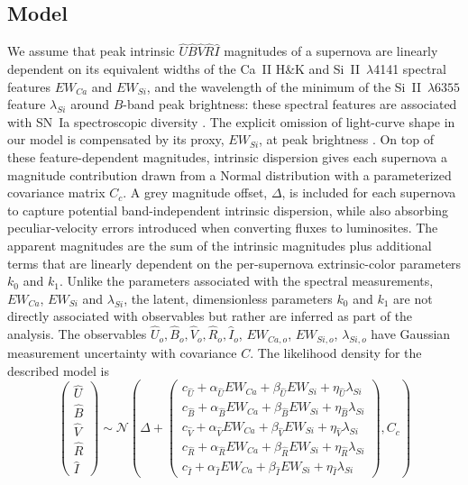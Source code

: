 \documentclass{aastex61}   	%
\begin{document}
\subsection{Model}
\label{modelmodel:sec}
We assume 
that  peak intrinsic ${\hat{U}}{\hat{B}}\hat{V}\hat{R}\hat{I}$ magnitudes of a supernova are linearly dependent
on its
 equivalent widths of the Ca~II H\&K and Si~II~$\lambda$4141 spectral features
$EW_{Ca}$ and $EW_{Si}$,
and the wavelength of the minimum of 
the Si~II~$\lambda6355$ feature $\lambda_{Si}$
around $B$-band peak brightness:
these spectral features are associated with SN~Ia  spectroscopic diversity  
\citep{2006PASP..118..560B, 2008A&A...492..535A, 2009A&A...500L..17B, 2009PASP..121..238B, 2009ApJ...699L.139W, 2011ApJ...729...55F}.
The explicit omission of light-curve shape in our model is compensated by its proxy,
$EW_{Si}$, at peak brightness
\citep{2008A&A...492..535A, 2011A&A...529L...4C}. On top of these feature-dependent magnitudes, intrinsic dispersion
gives each supernova a magnitude contribution drawn from a Normal distribution with a parameterized covariance matrix
$C_c$.  A grey magnitude offset, $\Delta$, is included for each supernova
to capture 
potential
band-independent intrinsic dispersion, while also absorbing peculiar-velocity errors introduced when converting
fluxes to luminosites.
The apparent magnitudes are the sum of the intrinsic magnitudes plus additional terms that are linearly dependent on the
per-supernova
extrinsic-color parameters $k_0$ and $k_1$.  
Unlike the parameters associated with
the spectral measurements, $EW_{Ca}$, $EW_{Si}$ and $\lambda_{Si}$,  the latent,
\color{red}
dimensionless
\color{black}
parameters $k_0$ and $k_1$ are not directly associated
with observables but rather are inferred as part of the analysis.
The observables
$\hat{U}_o, {\hat{B}}_o, {\hat{V}}_o, {\hat{R}}_o, {\hat{I}}_o$, $EW_{Ca,o}$, $EW_{Si,o}$, $\lambda_{Si,o}$
have Gaussian measurement uncertainty with covariance $C$.
The
likelihood density for the described model
is
\begin{equation}
\begin{pmatrix}
{\hat{U}}\\{\hat{B}}\\{\hat{V}}\\{\hat{R}}\\{\hat{I}}
\end{pmatrix}
\sim \mathcal{N}
\left(
\Delta +
\begin{pmatrix}
c_{\hat{U}}+\alpha_{\hat{U}} EW_{Ca} + \beta_{\hat{U}} EW_{Si} + \eta_{\hat{U}} \lambda_{Si} \\
c_{\hat{B}}+\alpha_{\hat{B}} EW_{Ca} + \beta_{\hat{B}} EW_{Si} + \eta_{\hat{B}} \lambda_{Si}  \\
c_{\hat{V}}+\alpha_{\hat{V}} EW_{Ca} + \beta_{\hat{V}} EW_{Si} + \eta_{\hat{V}} \lambda_{Si} \\
c_{\hat{R}}+\alpha_{\hat{R}} EW_{Ca} + \beta_{\hat{R}} EW_{Si} + \eta_{\hat{R}} \lambda_{Si} \\
c_{\hat{I}}+\alpha_{\hat{I}} EW_{Ca} + \beta_{\hat{I}} EW_{Si}+ \eta_{\hat{I}} \lambda_{Si}
\end{pmatrix}
,C_{c}
\right)
\label{ewsiv:eqn}
\end{equation}
\end{document}
